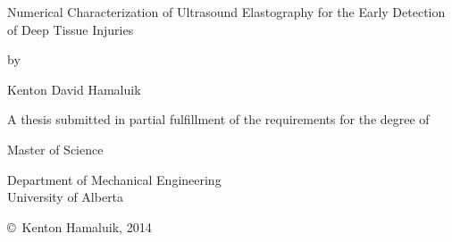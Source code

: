 \begin{center}
	\vspace*{\fill}
	Numerical Characterization of Ultrasound Elastography for the Early Detection of Deep Tissue Injuries
	\vspace{1em}

	by
	\vspace{1em}

	Kenton David Hamaluik
	\vspace{6em}

	A thesis submitted in partial fulfillment of the requirements for the degree of
	\vspace{2em}

	Master of Science
	\vspace{6em}

	Department of Mechanical Engineering\\
	University of Alberta
	\vspace{10em}

	\copyright\ Kenton Hamaluik, 2014
	\vspace*{\fill}
\end{center}